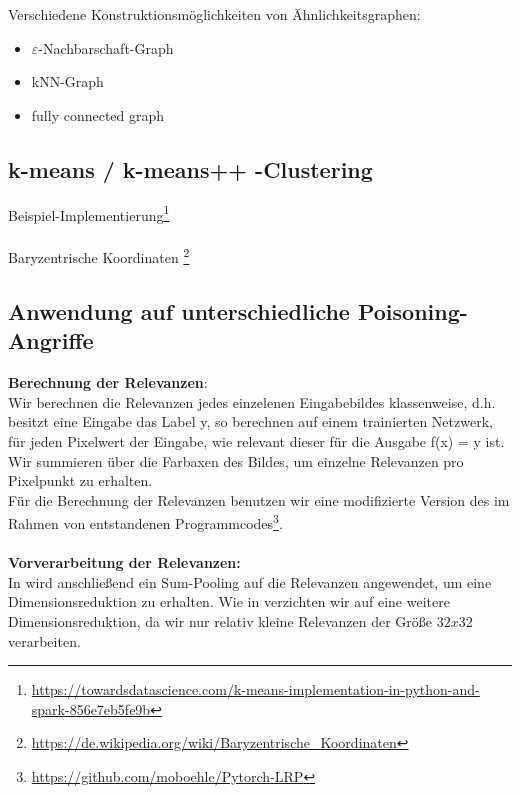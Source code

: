 \documentclass[twoside, 12pt,a4paper]{article}
\numberwithin{equation}{section}
\begin{document}
	Verschiedene Konstruktionsmöglichkeiten von Ähnlichkeitsgraphen:
	
	\begin{itemize}
		\item $\varepsilon$-Nachbarschaft-Graph\\
		\item kNN-Graph\\
		\item fully connected graph
	\end{itemize}

	\subsection{k-means / k-means++ -Clustering}
	
	Beispiel-Implementierung\footnote{\url{https://towardsdatascience.com/k-means-implementation-in-python-and-spark-856e7eb5fe9b}}\\
	\\
	Baryzentrische Koordinaten \footnote{\url{https://de.wikipedia.org/wiki/Baryzentrische_Koordinaten}}
	\subsection{Anwendung auf unterschiedliche Poisoning-Angriffe} \label{chapter_results} \label{chapter_experiments}
	\noindent \textbf{Berechnung der Relevanzen}:\\
	
	\noindent Wir berechnen die Relevanzen jedes einzelenen Eingabebildes klassenweise, d.h. besitzt eine Eingabe das Label y, so berechnen auf einem trainierten Netzwerk, für jeden Pixelwert der Eingabe, wie relevant dieser für die Ausgabe f(x) = y ist.\\
	Wir summieren über die Farbaxen des Bildes, um einzelne Relevanzen pro Pixelpunkt zu erhalten.\\
	Für die Berechnung der Relevanzen benutzen wir eine modifizierte Version des im Rahmen von \cite{lrp_alzheimer} entstandenen Programmcodes\footnote{\url{https://github.com/moboehle/Pytorch-LRP}}.\\
	\\
	\noindent \textbf{Vorverarbeitung der Relevanzen:}\\
	In \cite{unmaskingCH} wird anschließend ein Sum-Pooling auf die Relevanzen angewendet, um eine Dimensionsreduktion zu erhalten. Wie in \cite{imagenet_unhansed_v1} verzichten wir auf eine weitere Dimensionsreduktion, da wir nur relativ kleine Relevanzen der Größe $32x32$ verarbeiten.	\\
	
\end{document}
